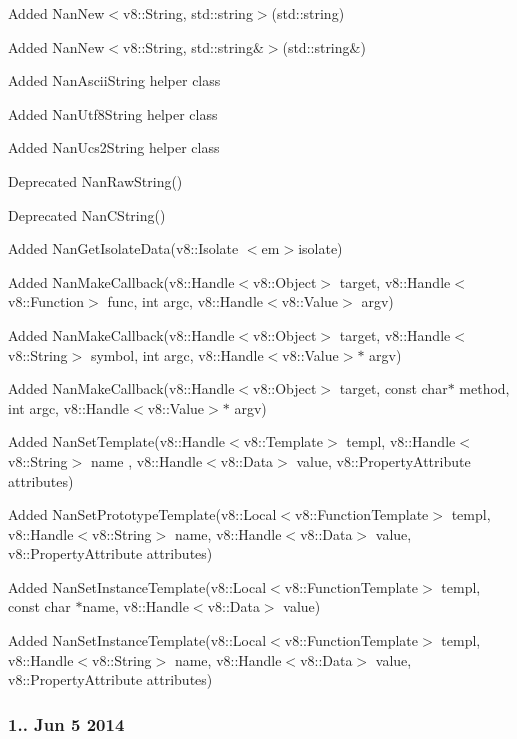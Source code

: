 \begin{DoxyItemize}
\item Added Nan\+New$<$v8\+::\+String, std\+::string$>$(std\+::string)
\item Added Nan\+New$<$v8\+::\+String, std\+::string\&$>$(std\+::string\&)
\item Added Nan\+Ascii\+String helper class
\item Added Nan\+Utf8\+String helper class
\item Added Nan\+Ucs2\+String helper class
\item Deprecated Nan\+Raw\+String()
\item Deprecated Nan\+C\+String()
\item Added Nan\+Get\+Isolate\+Data(v8\+::\+Isolate $<$em$>$isolate)
\item Added Nan\+Make\+Callback(v8\+::\+Handle$<$v8\+::\+Object$>$ target, v8\+::\+Handle$<$v8\+::\+Function$>$ func, int argc, v8\+::\+Handle$<$v8\+::\+Value$>$ argv)
\item Added Nan\+Make\+Callback(v8\+::\+Handle$<$v8\+::\+Object$>$ target, v8\+::\+Handle$<$v8\+::\+String$>$ symbol, int argc, v8\+::\+Handle$<$v8\+::\+Value$>$$\ast$ argv)
\item Added Nan\+Make\+Callback(v8\+::\+Handle$<$v8\+::\+Object$>$ target, const char$\ast$ method, int argc, v8\+::\+Handle$<$v8\+::\+Value$>$$\ast$ argv)
\item Added Nan\+Set\+Template(v8\+::\+Handle$<$v8\+::\+Template$>$ templ, v8\+::\+Handle$<$v8\+::\+String$>$ name , v8\+::\+Handle$<$v8\+::\+Data$>$ value, v8\+::\+Property\+Attribute attributes)
\item Added Nan\+Set\+Prototype\+Template(v8\+::\+Local$<$v8\+::\+Function\+Template$>$ templ, v8\+::\+Handle$<$v8\+::\+String$>$ name, v8\+::\+Handle$<$v8\+::\+Data$>$ value, v8\+::\+Property\+Attribute attributes)
\item Added Nan\+Set\+Instance\+Template(v8\+::\+Local$<$v8\+::\+Function\+Template$>$ templ, const char $\ast$name, v8\+::\+Handle$<$v8\+::\+Data$>$ value)
\item Added Nan\+Set\+Instance\+Template(v8\+::\+Local$<$v8\+::\+Function\+Template$>$ templ, v8\+::\+Handle$<$v8\+::\+String$>$ name, v8\+::\+Handle$<$v8\+::\+Data$>$ value, v8\+::\+Property\+Attribute attributes)
\end{DoxyItemize}

\subsubsection*{1.. Jun 5 2014}


